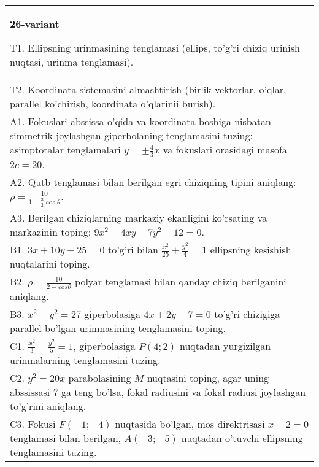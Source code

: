 \documentclass{article}
\begin{document}
\begin{tabular}{m{17cm}}
\textbf{26-variant}
\newline

T1. Ellipsning urinmasining tenglamasi (ellips, to'g'ri chiziq urinish nuqtasi, urinma tenglamasi).\\

T2. Koordinata sistemasini almashtirish (birlik vektorlar, o'qlar, parallel ko'chirish, koordinata o'qlarinii burish).\\

A1. Fokuslari abssissa o'qida va koordinata boshiga nisbatan simmetrik joylashgan giperbolaning tenglamasini tuzing: asimptotalar tenglamalari $y=\pm \frac{4}{3}x$ va fokuslari orasidagi masofa $2c=20$.\\

A2. Qutb tenglamasi bilan berilgan egri chiziqning tipini aniqlang: $\rho=\frac{10}{1-\frac{3}{2}\cos\theta}$.\\

A3. Berilgan chiziqlarning markaziy ekanligini ko'rsating va markazinin toping: $9x^{2}-4xy-7y^{2}-12=0$.\\

B1. $3x + 10y - 25 = 0$ to'g'ri bilan $\frac{x^{2}}{25} + \frac{y^{2}}{4} = 1$ ellipsning kesishish nuqtalarini toping.  \\

B2. $\rho = \frac{10}{2 - cos\theta}$ polyar tenglamasi bilan qanday chiziq berilganini aniqlang.  \\

B3. $x^{2} - y^{2} = 27$ giperbolasiga $4x + 2y - 7 = 0$ to'g'ri chizigiga parallel bo'lgan urinmasining tenglamasini toping.  \\

C1. $\frac{x^{2}}{3} - \frac{y^{2}}{5} = 1$, giperbolasiga $P(4;2)$ nuqtadan yurgizilgan urinmalarning tenglamasini tuzing.  \\

C2. $y^{2} = 20x$ parabolasining $M$ nuqtasini toping, agar uning abssissasi 7 ga teng bo'lsa, fokal radiusini va fokal radiusi joylashgan to'g'rini aniqlang.\\

C3. Fokusi $F( - 1; - 4)$ nuqtasida bo'lgan, mos direktrisasi $x - 2 = 0$ tenglamasi bilan berilgan, $A( - 3; - 5)$ nuqtadan o'tuvchi ellipsning tenglamasini tuzing.  \\

\end{tabular}
\vspace{1cm}
\end{document}
